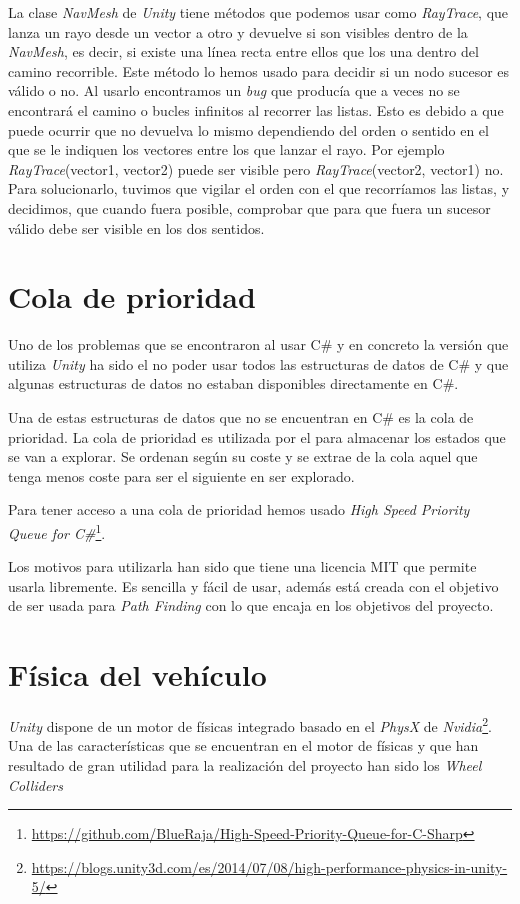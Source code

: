 La clase \textit{NavMesh} de \textit{Unity} tiene métodos que podemos usar como \textit{RayTrace}, que lanza un rayo desde un vector a otro y devuelve si son visibles dentro de la \textit{NavMesh}, es decir, si existe una línea recta entre ellos que los una dentro del camino recorrible. Este método lo hemos usado para decidir si un nodo sucesor es válido o no. Al usarlo encontramos un \textit{bug} que producía que a veces no se encontrará el camino o bucles infinitos al recorrer las listas. Esto es debido a que puede ocurrir que no devuelva lo mismo dependiendo del orden o sentido en el que se le indiquen los vectores entre los que lanzar el rayo. Por ejemplo \textit{RayTrace}(vector1, vector2) puede ser visible pero \textit{RayTrace}(vector2, vector1) no. Para solucionarlo, tuvimos que vigilar el orden con el que recorríamos las listas, y decidimos, que cuando fuera posible, comprobar que para que fuera un sucesor válido debe ser visible en los dos sentidos.

\section{Cola de prioridad}
Uno de los problemas que se encontraron al usar C\# y en concreto la versión que utiliza \textit{Unity} ha sido el no poder usar todos las estructuras de datos de C\# y que algunas estructuras de datos no estaban disponibles directamente en C\#.

Una de estas estructuras de datos que no se encuentran en C\# es la cola de prioridad. La cola de prioridad es utilizada por el \Astar para almacenar los estados que se van a explorar. Se ordenan según su coste y se extrae de la cola aquel que tenga menos coste para ser el siguiente en ser explorado.

Para tener acceso a una cola de prioridad hemos usado
\textit{High Speed Priority Queue for C\#\cite{bluerajacola}}\footnote{\url{https://github.com/BlueRaja/High-Speed-Priority-Queue-for-C-Sharp}}.

Los motivos para utilizarla han sido que tiene una licencia MIT que permite usarla libremente. Es sencilla y fácil de usar, además está creada con el objetivo de ser usada para \textit{Path Finding} con lo que encaja en los objetivos del proyecto.

\section{Física del vehículo}
\textit{Unity} dispone de un motor de físicas integrado basado en el \textit{PhysX} de \textit{Nvidia}\footnote{\url{https://blogs.unity3d.com/es/2014/07/08/high-performance-physics-in-unity-5/}}. Una de las características que se encuentran en el motor de físicas y que han resultado de gran utilidad para la realización del proyecto han sido los \textit{Wheel Colliders}


